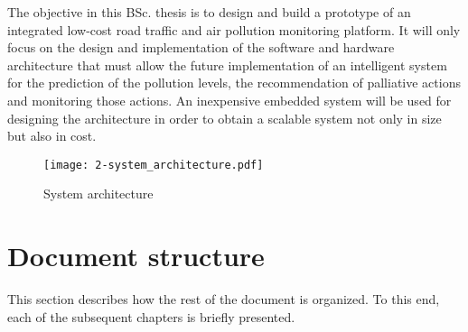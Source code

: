 The objective in this \ac{BSc.} thesis is to design and build a prototype of an integrated low-cost road traffic and air pollution monitoring platform. It will only focus on the design and implementation of the software and hardware architecture that must allow the future implementation of an intelligent system for the prediction of the pollution levels, the recommendation of palliative actions and monitoring those actions. An inexpensive embedded system will be used for designing the architecture in order to obtain a scalable system not only in size but also in cost.


\begin{figure}[!h]
	\begin{center}
		\texttt{[image: 2-system\_architecture.pdf]}	
		\caption{System architecture}
		\label{fig:2-system_architecture}
	\end{center}
\end{figure}




\section{Document structure}

This section describes how the rest of the document is organized. To this end, each of the subsequent chapters is briefly presented.

